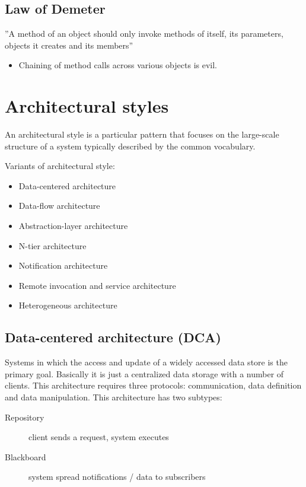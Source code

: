 \documentclass[a4paper]{report}
\begin{document}
\section{Law of Demeter}

''A method of an object should only invoke methods of itself, its
parameters, objects it creates and its members''

\begin{itemize}
  \item Chaining of method calls across various objects is evil.
\end{itemize}



\chapter{Architectural styles}

An architectural style is a particular pattern that focuses on the
large-scale structure of a system typically described by the common
vocabulary.

Variants of architectural style:

\begin{itemize}
  \item Data-centered architecture
  \item Data-flow architecture
  \item Abstraction-layer architecture
  \item N-tier architecture
  \item Notification architecture
  \item Remote invocation and service architecture
  \item Heterogeneous architecture
\end{itemize}

\section{Data-centered architecture (DCA)}

Systems in which the access and update of a widely accessed data store is the
primary goal. Basically it is just a centralized data storage with a number
of clients. This architecture requires three protocols: communication, data
definition and data manipulation. This architecture has two subtypes:

\begin{description}
  \item[Repository] client sends a request, system executes
  \item[Blackboard] system spread notifications / data to subscribers
\end{description}
\end{document}
